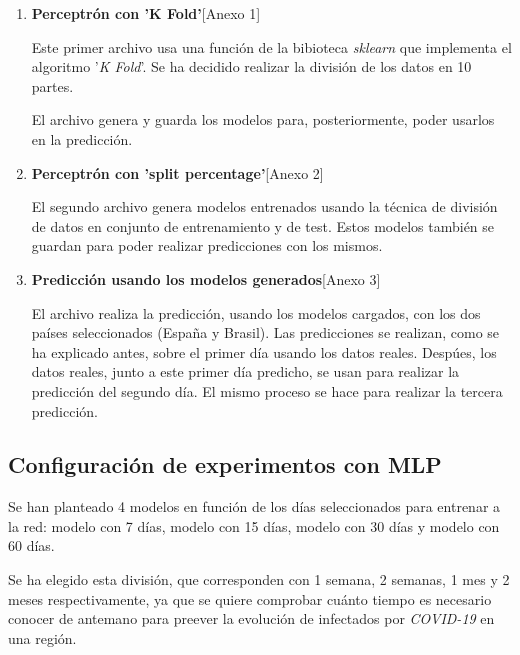 \documentclass[12pt,a4paper, xcolor=table]{article}
\begin{document}
    \begin{enumerate}
      \item \textbf{Perceptrón con 'K Fold'}[Anexo 1]

        Este primer archivo usa una función de la bibioteca \textit{sklearn} que implementa el algoritmo '\textit{K Fold}'. Se ha decidido realizar la división de los datos en 10 partes.

        \vspace{2mm}

        El archivo genera y guarda los modelos para, posteriormente, poder usarlos en la predicción.

      \item \textbf{Perceptrón con 'split percentage'}[Anexo 2]

        El segundo archivo genera modelos entrenados usando la técnica de división de datos en conjunto de entrenamiento y de test. Estos modelos también se guardan para poder realizar predicciones con los mismos.

      \item \textbf{Predicción usando los modelos generados}[Anexo 3]

        El archivo realiza la predicción, usando los modelos cargados, con los dos países seleccionados (España y Brasil). Las predicciones se realizan, como se ha explicado antes, sobre el primer día usando los datos reales. Despúes, los datos reales, junto a este primer día predicho, se usan para realizar la predicción del segundo día. El mismo proceso se hace para realizar la tercera predicción.

    \end{enumerate}




    \subsection{Configuración de experimentos con MLP}

      Se han planteado 4 modelos en función de los días seleccionados para entrenar a la red: modelo con 7 días, modelo con 15 días, modelo con 30 días y modelo con 60 días.

      \vspace{2mm}

      Se ha elegido esta división, que corresponden con 1 semana, 2 semanas, 1 mes y 2 meses respectivamente, ya que se quiere comprobar cuánto tiempo es necesario conocer de antemano para preever la evolución de infectados por \textit{COVID-19} en una región.
\end{document}

